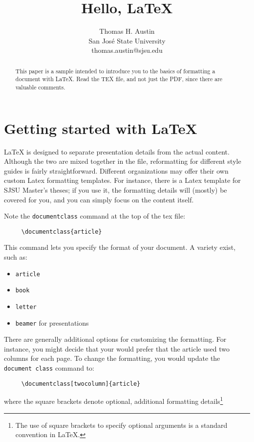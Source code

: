 \documentclass{article}
\title{Hello, \LaTeX}
\author{
  Thomas H. Austin \\
  San Jos\'{e} State University \\
  thomas.austin@sjsu.edu
  }
\begin{document}
\maketitle

\begin{abstract}
This paper is a sample intended to introduce you to the basics of formatting a document with \LaTeX.
Read the TEX file, and not just the PDF, since there are valuable comments.
\end{abstract}

\section{Getting started with \LaTeX}
LaTeX is designed to separate presentation details from the actual content.
Although the two are mixed together in the file,
reformatting for different style guides is fairly straightforward.
Different organizations may offer their own custom Latex formatting templates.
For instance, there is a Latex template for SJSU Master's theses;
if you use it, the formatting details will (mostly) be covered for you,
and you can simply focus on the content itself.

Note the {\tt documentclass} command at the top of the tex file:
\begin{verbatim}
     \documentclass{article}
\end{verbatim}
This command lets you specify the format of your document.
A variety exist, such as:
\begin{itemize}
  \item {\tt article}
  \item {\tt book}
  \item {\tt letter}
  \item {\tt beamer} for presentations
\end{itemize}

There are generally additional options for customizing the formatting.
For instance, you might decide that your would prefer that the article used
two columns for each page.
To change the formatting, you would update the {\tt document class} command to:
\begin{verbatim}
     \documentclass[twocolumn]{article}
\end{verbatim}
where the square brackets denote optional, additional formatting details\footnote{
The use of square brackets to specify optional arguments is a standard convention in LaTeX.
}
\end{document}
